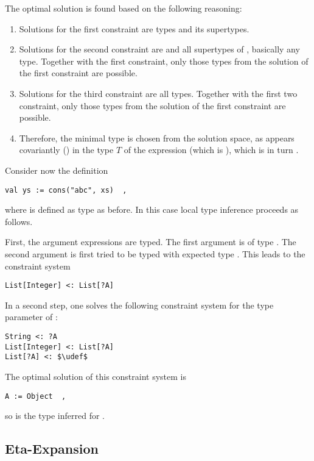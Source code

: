 The optimal solution is found based on the following reasoning: 
\begin{enumerate}
\item Solutions for the first constraint are types  and its supertypes.
\item Solutions for the second constraint are  and all supertypes of , basically any type. Together with the first constraint, only those types from the solution of the first constraint are possible. 
\item Solutions for the third constraint are all types. Together with the first two constraint, only those types from the solution of the first constraint are possible. 
\item Therefore, the minimal type is chosen from the solution space, as  appears covariantly () in the type $T$ of the expression (which is ), which is in turn . 
\end{enumerate}

\example Consider now the definition
\begin{lstlisting}
val ys := cons("abc", xs)  ,
\end{lstlisting}
where  is defined as type  as before. In this case local type inference proceeds as follows.

First, the argument expressions are typed. The first argument  is of type . The second argument  is first tried to be typed with expected type . This leads to the constraint system
\begin{lstlisting}
List[Integer] <: List[?A]
\end{lstlisting}

In a second step, one solves the following constraint system for the type parameter  of :
\begin{lstlisting}
String <: ?A
List[Integer] <: List[?A]
List[?A] <: $\udef$
\end{lstlisting}

The optimal solution of this constraint system is
\begin{lstlisting}
A := Object  ,
\end{lstlisting}
so  is the type inferred for . 





\subsection{Eta-Expansion}
\label{sec:eta-expansion}


